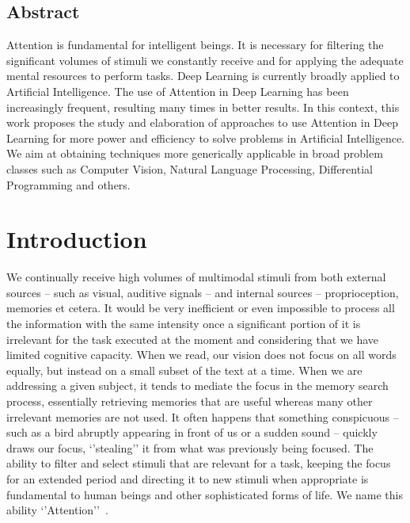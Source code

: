 \documentclass[English]{style/ic-tese-v3}
\begin{document}


\paginasiniciais
\section*{Abstract}
Attention is fundamental for intelligent beings.
It is necessary for filtering the significant volumes of stimuli we constantly receive
and for applying the adequate mental resources to perform tasks.
Deep Learning is currently broadly applied to Artificial Intelligence.
The use of Attention in Deep Learning has been increasingly frequent,
resulting many times in better results.
In this context, this work proposes the study and elaboration of approaches to use Attention in Deep Learning
for more power and efficiency to solve problems in Artificial Intelligence.
We aim at obtaining techniques more generically applicable in broad problem classes
such as Computer Vision, Natural Language Processing, Differential Programming and others.
\fimdaspaginasiniciais


\chapter{Introduction}
We continually receive high volumes of multimodal stimuli from both external sources
-- such as visual, auditive signals -- and internal sources -- proprioception, memories et cetera.
It would be very inefficient or even impossible to process all the information with
the same intensity once a significant portion of it is irrelevant for
the task executed at the moment and considering that we have limited cognitive capacity.
When we read, our vision does not focus on all
words equally, but instead on a small subset of the text at a time.
When we are addressing a given subject, it tends to mediate the focus
in the memory search process, essentially retrieving memories that
are useful whereas many other irrelevant memories are not used.
It often happens that something conspicuous
-- such as a bird abruptly appearing in front of us or a sudden sound --
quickly draws our focus, `'stealing'' it from what was previously being focused.
The ability to filter and select stimuli that are relevant for a task, keeping the focus for an
extended period and directing it to new stimuli when appropriate is fundamental to
human beings and other sophisticated forms of life.
We name this ability `'Attention''~\cite{ref:esther-thesis}.
\end{document}
